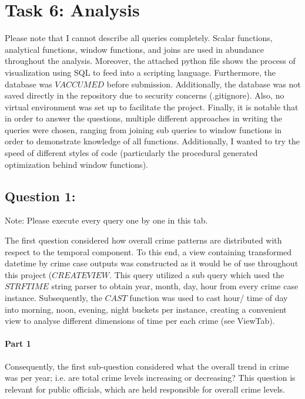 \documentclass[a4paper]{article}
\begin{document}



\section{Task 6: Analysis}
Please note that I cannot describe all queries completely. Scalar functions, analytical functions, window functions, and joins are used in abundance throughout the analysis. Moreover, the attached python file shows the process of visualization using SQL to feed into a scripting language. Furthermore, the database was $VACCUMED$ before submission. 
Additionally, the database was not saved directly in the repository due to security concerns (.gitignore). Also, no virtual environment was set up to facilitate the project. Finally, it is notable that in order to answer the questions, multiple different approaches in writing the queries were chosen, ranging from joining sub queries to window functions in order to demonstrate knowledge of all functions. Additionally, I wanted to try the speed of different styles of code (particularly the procedural generated optimization behind window functions).

\subsection{Question 1:}

Note: Please execute every query one by one in this tab.

The first question considered how overall crime patterns are distributed with respect to the temporal component. To this end, a view containing transformed datetime by crime case  outputs was constructed as it would be of use throughout this project ($CREATE VIEW$. This query utilized a sub query which used the $STRFTIME$ string parser to obtain year, month, day, hour from every crime case instance. Subsequently, the $CAST$ function was used to cast hour/ time of day into morning, noon, evening, night buckets per instance, creating a convenient view to analyse different dimensions of time per each crime (see ViewTab).


\paragraph{Part 1} Consequently, the first sub-question considered what the overall trend in crime was per year; i.e. are total crime levels increasing or decreasing? This question is relevant for public officials, which are held responsible for overall crime levels. 
\end{document}
